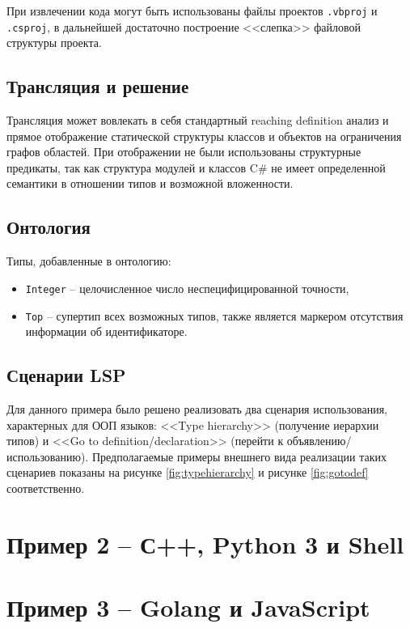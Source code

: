 При извлечении кода могут быть использованы файлы проектов \texttt{.vbproj} и \texttt{.csproj}, в дальнейшей
достаточно построение <<слепка>> файловой структуры проекта.

\subsection{Трансляция и решение}

Трансляция может вовлекать в себя стандартный reaching definition анализ \cite{static-program-analysis} и прямое отображение
статической структуры классов и объектов на ограничения графов областей. При отображении не были использованы
структурные предикаты, так как структура модулей и классов C\# не имеет определенной семантики в отношении
типов и возможной вложенности. 

\subsection{Онтология}

Типы, добавленные в онтологию:
\begin{itemize}
    \item \texttt{Integer} -- целочисленное число неспецифицированной точности,
    \item \texttt{Top} -- супертип всех возможных типов, также является маркером отсутствия информации об идентификаторе.
\end{itemize}

\subsection{Сценарии LSP}

Для данного примера было решено реализовать два сценария использования, характерных для ООП языков: <<Type hierarchy>> 
(получение иерархии типов) и <<Go to definition/declaration>> (перейти к объявлению/использованию).
Предполагаемые примеры внешнего вида реализации таких сценариев показаны на рисунке \ref{fig:typehierarchy} и рисунке \ref{fig:gotodef}
соответственно.


\section{Пример 2 -- С++, Python 3 и Shell}

\section{Пример 3 -- Golang и JavaScript}

\clearpage